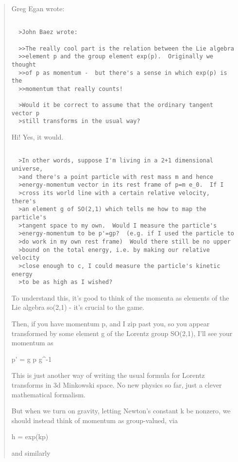 \begin{quote}
  Greg Egan wrote:


\begin{verbatim}

  >John Baez wrote:

  >>The really cool part is the relation between the Lie algebra 
  >>element p and the group element exp(p).  Originally we thought 
  >>of p as momentum -  but there's a sense in which exp(p) is the 
  >>momentum that really counts!

  >Would it be correct to assume that the ordinary tangent vector p 
  >still transforms in the usual way?  
\end{verbatim}
    

  Hi!  Yes, it would.


\begin{verbatim}

  >In other words, suppose I'm living in a 2+1 dimensional universe, 
  >and there's a point particle with rest mass m and hence 
  >energy-momentum vector in its rest frame of p=m e_0.  If I
  >cross its world line with a certain relative velocity, there's 
  >an element g of SO(2,1) which tells me how to map the particle's 
  >tangent space to my own.  Would I measure the particle's 
  >energy-momentum to be p'=gp?  (e.g. if I used the particle to 
  >do work in my own rest frame)  Would there still be no upper 
  >bound on the total energy, i.e. by making our relative velocity 
  >close enough to c, I could measure the particle's kinetic energy 
  >to be as high as I wished?
\end{verbatim}
    

  To understand this, it's good to think of the momenta as 
  elements of the Lie algebra so(2,1) - it's crucial to the
  game.  

  Then, if you have momentum p, and I zip past you, so you 
  appear transformed by some element g of the Lorentz group 
  SO(2,1), I'll see your momentum as

  p' = g p g^{-1}

  This is just another way of writing the usual formula for 
  Lorentz transforms in 3d Minkowski space.  No new physics 
  so far, just a clever mathematical formalism.

  But when we turn on gravity, letting Newton's constant k 
  be nonzero, we should instead think of momentum as group-valued, 
  via 

  h = exp(kp)

  and similarly 


\end{quote}
